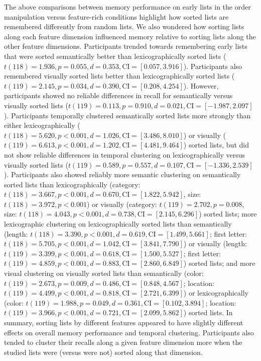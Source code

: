 \documentclass[11pt]{article}
\begin{document}
The above comparisons between memory performance on early lists in the order
manipulation versus feature-rich conditions highlight how sorted lists are
remembered differently from random lists. We also wondered how sorting lists
along each feature dimension influenced memory relative to sorting lists along
the other feature dimensions. Participants trended towards remembering early
lists that were sorted semantically better than lexicographically sorted lists
($t(118) = 1.936, p = 0.055, d = 0.353, \mathrm{CI} = [0.057, 3.916]$).
Participants also remembered visually sorted lists better than
lexicographically sorted lists ($t(119) = 2.145, p = 0.034, d = 0.390,
\mathrm{CI} = [0.208, 4.254]$). However, participants showed no reliable
differences in recall for semantically versus visually sorted lists ($t(119) =
0.113, p = 0.910, d = 0.021, \mathrm{CI} = [-1.987, 2.097]$). Participants
temporally clustered semantically sorted lists more strongly than either
lexicographically ($t(118) = 5.620, p < 0.001, d = 1.026, \mathrm{CI} = [3.486,
8.010]$) or visually ($t(119) = 6.613, p < 0.001, d = 1.202, \mathrm{CI} =
[4.481, 9.464]$) sorted lists, but did not show reliable differences in
temporal clustering on lexicographically versus visually sorted lists ($t(119)
= 0.589, p = 0.557, d = 0.107, \mathrm{CI} = [-1.336, 2.539]$). Participants
also showed reliably more semantic clustering on semantically sorted lists than
lexicographically (category: $t(118) = 3.667, p < 0.001, d = 0.670, \mathrm{CI}
= [1.822, 5.942]$, size: $t(118) = 3.972, p < 0.001$) or visually (category:
$t(119) = 2.702, p = 0.008$, size: $t(118) = 4.043, p < 0.001, d = 0.738,
\mathrm{CI} = [2.145, 6.296]$) sorted lists; more lexicographic clustering on
lexicographically sorted lists than semantically (length: $t(118) = 3.390, p <
0.001, d = 0.619, \mathrm{CI} = [1.499, 5.661]$; first letter: $t(118) = 5.705,
p < 0.001, d = 1.042, \mathrm{CI} = [3.841, 7.790]$) or visually (length:
$t(119) = 3.399, p < 0.001, d = 0.618, \mathrm{CI} = [1.500, 5.527]$; first
letter: $t(119) = 4.859, p < 0.001, d = 0.883, \mathrm{CI} = [2.860, 6.849]$)
sorted lists; and more visual clustering on visually sorted lists than
semantically (color: $t(119) = 2.673, p = 0.009, d = 0.486, \mathrm{CI} =
[0.848, 4.567]$; location: $t(119) = 4.499, p < 0.001, d = 0.818, \mathrm{CI} =
[2.721, 6.399]$) or lexicographically (color: $t(119) = 1.988, p = 0.049, d =
0.361, \mathrm{CI} = [0.102, 3.894]$; location: $t(119) = 3.966, p < 0.001, d =
0.721, \mathrm{CI} = [2.099, 5.862]$) sorted lists. In summary, sorting lists
by different features appeared to have slightly different effects on overall
memory performance and temporal clustering. Participants also tended to cluster
their recalls along a given feature dimension more when the studied lists were
(versus were not) sorted along that dimension.
\end{document}

